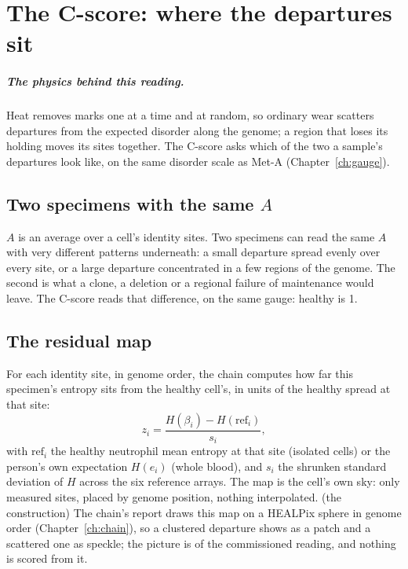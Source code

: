 \chapter{The C-score: where the departures sit}\label{ch:cscore}

\paragraph{The physics behind this reading.} Heat removes marks one at a time and at random, so ordinary wear scatters departures from the expected disorder along the genome; a region that loses its holding moves its sites together. The C-score asks which of the two a sample's departures look like, on the same disorder scale as Met-A (Chapter~\ref{ch:gauge}).

\section{Two specimens with the same $A$}

$A$ is an average over a cell's identity sites. Two specimens can read the same $A$ with very different patterns underneath:
a small departure spread evenly over every site, or a large departure concentrated in a few regions of the genome. The second
is what a clone, a deletion or a regional failure of maintenance would leave. The C-score reads that difference, on the same
gauge: healthy is 1.

\section{The residual map}

For each identity site, in genome order, the chain computes how far this specimen's entropy sits from the healthy cell's,
in units of the healthy spread at that site:
\begin{equation}
  z_i=\frac{H(\beta_i)-H(\mathrm{ref}_i)}{s_i},
  \label{eq:z}
\end{equation}
with $\mathrm{ref}_i$ the healthy neutrophil mean entropy at that site (isolated cells) or the person's own expectation
$H(e_i)$ (whole blood), and $s_i$ the shrunken standard deviation of $H$ across the six reference arrays. The map is the cell's own sky: only measured sites, placed by genome position, nothing interpolated. \derived{} (the construction) The chain's report draws this map on a HEALPix sphere in genome order (Chapter~\ref{ch:chain}), so a clustered departure shows as a patch and a scattered one as speckle; the picture is of the commissioned reading, and nothing is scored from it.

